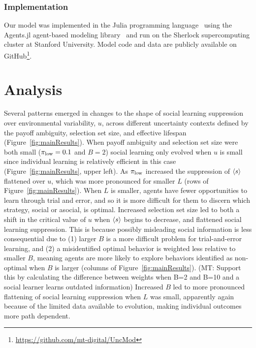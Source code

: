 \documentclass[letterpaper,11.5pt]{scrartcl}
\newcommand{\mt}[1]{{\textcolor{myorange} {({\tiny MT:} #1)}}}
\begin{document}
\subsubsection{Implementation}
Our model was implemented in the Julia programming language~\cite{Bezanson2017} 
using the Agents.jl agent-based modeling library~\cite{Datseris2022} and run
on the Sherlock supercomputing cluster at Stanford University. Model code and
data are publicly available on GitHub\footnote{\url{https://github.com/mt-digital/UncMod}}.


\section{Analysis}

Several patterns emerged in changes to the shape of social learning suppression over
environmental variability, $u$, across different uncertainty contexts defined by the
payoff ambiguity, selection set size, and effective lifespan
(Figure~\ref{fig:mainResults}). When payoff ambiguity and selection set size were
both small ($\pi_{\mathrm{low}} = 0.1$ and $B=2$) social learning only evolved when $u$ is small
since individual learning is relatively efficient in this case
(Figure~\ref{fig:mainResults}, upper left). As $\pi_{\mathrm{low}}$ increased the suppression of
$\langle s \rangle$ flattened over $u$, which was more pronounced for smaller $L$ (rows of
Figure~\ref{fig:mainResults}).  When $L$ is smaller, agents have fewer opportunities
to learn through trial and error, and so it is more difficult for them to discern
which strategy, social or asocial, is optimal. Increased selection set size led to
both a shift in the critical value of $u$ when $\langle s \rangle$ begins to decrease, and
flattened social learning suppression. This is because possibly misleading 
social information is less consequential due
to (1) larger $B$ is a more difficult problem for trial-and-error learning, and
(2) a misidentified optimal behavior is weighted less relative to smaller
$B$, meaning agents are more likely to explore behaviors identified as non-optimal
when $B$ is larger (columns of Figure~\ref{fig:mainResults}).  \mt{Support this by calculating the difference between weights when B=2 and B=10 and a social learner learns outdated information}
Increased $B$ led to more pronounced flattening of social learning suppression when
$L$ was small, apparently again because of the limited data available to evolution,
making individual outcomes more path dependent.
\end{document}
